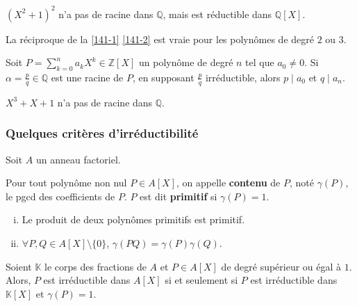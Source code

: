 	\begin{cexample}
		$(X^2+1)^2$ n'a pas de racine dans $\mathbb{Q}$, mais est réductible dans $\mathbb{Q}[X]$.
	\end{cexample}
	
	\begin{proposition}
		La réciproque de la \cref{141-1} \cref{141-2} est vraie pour les polynômes de degré $2$ ou $3$.
	\end{proposition}
	
	\begin{proposition}
		Soit $P = \sum_{k=0}^n a_k X^k \in \mathbb{Z}[X]$ un polynôme de degré $n$ tel que $a_0 \neq 0$. Si $\alpha = \frac{p}{q} \in \mathbb{Q}$ est une racine de $P$, en supposant $\frac{p}{q}$ irréductible, alors $p \mid a_0$ et $q \mid a_n$.
	\end{proposition}
	
	
	\begin{example}
		$X^3 + X + 1$ n'a pas de racine dans $\mathbb{Q}$.
	\end{example}
	
	\subsubsection{Quelques critères d'irréductibilité}
	
	Soit $A$ un anneau factoriel. 
	
	
	\begin{definition}
		Pour tout polynôme non nul $P \in A[X]$, on appelle \textbf{contenu} de $P$, noté $\gamma(P)$, le pgcd des coefficients de $P$. $P$ est dit \textbf{primitif} si $\gamma(P) = 1$.
	\end{definition}
	
	\begin{lemma}[Gauss]
		\begin{enumerate}[(i)]
			\item Le produit de deux polynômes primitifs est primitif.
			\item $\forall P, Q \in A[X] \setminus \{ 0 \}$, $\gamma(PQ) = \gamma(P) \gamma(Q)$.
		\end{enumerate}
	\end{lemma}
	
	\begin{theorem}
		Soient $\mathbb{K}$ le corps des fractions de $A$ et $P \in A[X]$ de degré supérieur ou égal à $1$. Alors, $P$ est irréductible dans $A[X]$ si et seulement si $P$ est irréductible dans $\mathbb{K}[X]$ et $\gamma(P)=1$.
	\end{theorem}
	
